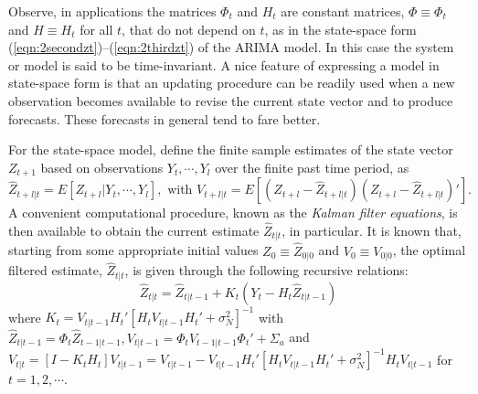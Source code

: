 Observe, in applications the matrices $\Phi_t$ and $H_t$ are constant matrices, $\Phi \equiv \Phi_t$ and $H \equiv H_t$ for all $t$, that do not depend on $t$, as in the state-space form (\ref{eqn:2secondzt})--(\ref{eqn:2thirdzt}) of the ARIMA model. In this case the system or model is said to be time-invariant. A nice feature of expressing a model in state-space form is that an updating procedure can be readily used when a new observation becomes available to revise the current state vector and to produce forecasts. These forecasts in general tend to fare better. 

For the state-space model, define the finite sample estimates of the state vector $Z_{t+1}$ based on observations $Y_t,\cdots,Y_l$ over the finite past time period, as
	\[
	\hat{Z}_{t+l|t} = E[Z_{t+l}|Y_t,\cdots,Y_l],\text{ with } V_{t+l|t} = E[(Z_{t+l} - \hat{Z}_{t+l|t})(Z_{t+l} - \hat{Z}_{t+l|t})'].
	\]
A convenient computational procedure, known as the \textit{Kalman filter equations}, is then available to obtain the current estimate $\hat{Z}_{t|t}$, in particular. It is known that, starting from some appropriate initial values $Z_0 \equiv \hat{Z}_{0|0}$ and $V_0 \equiv V_{0|0}$, the optimal filtered estimate, $\hat{Z}_{t|t}$, is given through the following recursive relations:
	\begin{equation}\label{eqn:2hatz}
	\hat{Z}_{t|t} = \hat{Z}_{t|t-1} + K_t(Y_t - H_t\hat{Z}_{t|t-1})
	\end{equation}
where $K_t= V_{t|t-1} H_t'[H_t V_{t|t-1} H_t' + \sigma_N^2]^{-1}$ with $\hat{Z}_{t|t-1} = \Phi_t \hat{Z}_{t-1|t-1},V_{t|t-1} = \Phi_t V_{t-1|t-1} \Phi_t' + \Sigma_{a}$ and $V_{t|t} = [I - K_tH_t] V_{t|t-1} = V_{t|t-1} - V_{t|t-1} H_t' [H_t V_{t|t-1} H_t' + \sigma_N^2]^{-1} H_t V_{t|t-1}$ for $t=1,2,\cdots$.


